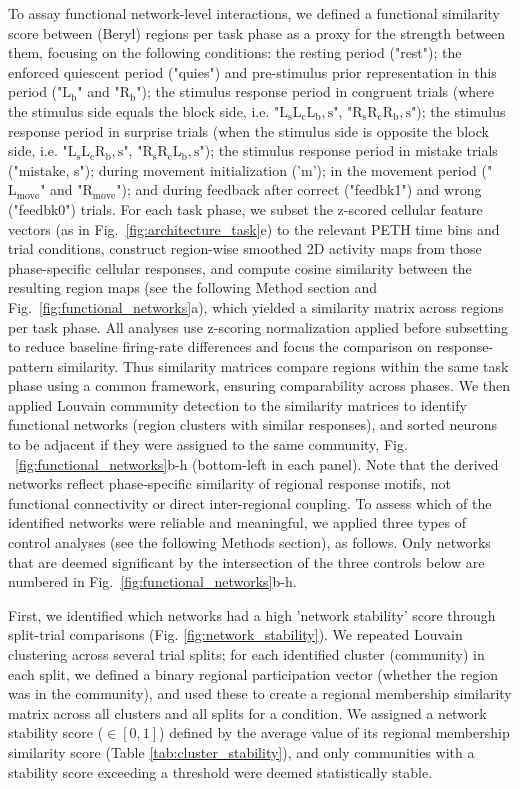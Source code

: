 To assay functional network-level interactions, we defined a functional similarity score between (Beryl) regions per task phase as a proxy for the strength between them, focusing on the following conditions: the resting period ("rest"); the enforced quiescent period ("quies") and pre-stimulus prior representation in this period ("$\mathrm{L_b}$" and "$\mathrm{R_b}$"); the stimulus response period in congruent trials (where the stimulus side equals the block side, i.e. "$\mathrm{L_{s}L_{c}L_{b}, s}$", "$\mathrm{R_{s}R_{c}R_{b}, s}$"); the stimulus response period in surprise trials (when the stimulus side is opposite the block side, i.e. "$\mathrm{L_{s}L_{c}R_{b}, s}$", "$\mathrm{R_{s}R_{c}L_{b}, s}$"); the stimulus response period in mistake trials ("mistake, s"); during movement initialization ('m'); in the movement period ("$\mathrm{L_{move}}$" and "$\mathrm{R_{move}}$"); and during feedback after correct ("feedbk1") and wrong ("feedbk0") trials. For each task phase, we subset the z-scored cellular feature vectors (as in Fig.~\ref{fig:architecture_task}e) to the relevant PETH time bins and trial conditions, construct region-wise smoothed 2D activity maps from those phase-specific cellular responses, and compute cosine similarity between the resulting region maps (see the following Method section and Fig.~\ref{fig:functional_networks}a), which yielded a similarity matrix across regions per task phase. All analyses use z-scoring normalization applied before subsetting to reduce baseline firing-rate differences and focus the comparison on response-pattern similarity. Thus similarity matrices compare regions within the same task phase using a common framework, ensuring comparability across phases. We then applied Louvain community detection to the similarity matrices to identify functional networks (region clusters with similar responses), and sorted neurons to be adjacent if they were assigned to the same community, Fig. ~\ref{fig:functional_networks}b-h (bottom-left in each panel). Note that the derived networks reflect phase-specific similarity of regional response motifs, not functional connectivity or direct inter-regional coupling. To assess which of the identified networks were reliable and meaningful, we applied three types of control analyses (see the following Methods section), as follows. Only networks that are deemed significant by the intersection of the three controls below are numbered in Fig.~\ref{fig:functional_networks}b-h. 

First, we identified which networks had a high 'network stability' score through split-trial comparisons (Fig. \ref{fig:network_stability}). We repeated Louvain clustering across several trial splits; for each identified cluster (community) in each split, we defined a binary regional participation vector (whether the region was in the community), and used these to create a regional membership similarity matrix across all clusters and all splits for a condition. We assigned a network stability score ($\in [0,1]$) defined by the average value of its regional membership similarity score (Table \ref{tab:cluster_stability}), and only communities with a stability score exceeding a threshold were deemed statistically stable. 

